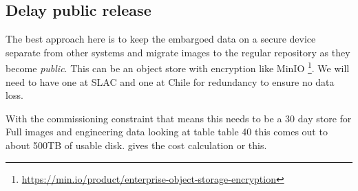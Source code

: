 
\subsection{Delay public release} \label{sec:3delay}

The best approach here is to keep the embargoed data on a secure device separate from other systems and migrate images to the regular repository as they become \emph{public}.
This can be an object store with encryption like MinIO \footnote{\url{ https://min.io/product/enterprise-object-storage-encryption}}.
We will need to have one at SLAC and one at Chile for redundancy to ensure no data loss.

With the commissioning constraint that means this needs to be a 30 day store  for Full images and engineering data looking at 
table table 40 this comes out to about 500TB of usable disk.
 gives the cost calculation or this.


